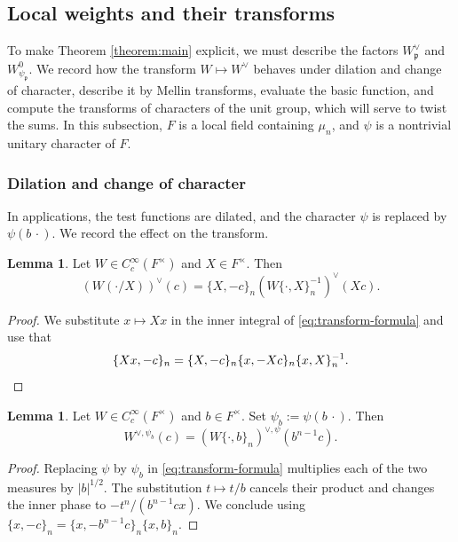 \documentclass[reqno]{amsart}
\theoremstyle{plain}
\theoremstyle{definition}
\theoremstyle{itplain}
\newtheorem{lemma}[theorem]{Lemma}
\numberwithin{equation}{section}
\numberwithin{theorem}{section}
\begin{document}
\subsection{Local weights and their transforms}\label{sec:local-computations}
To make Theorem \ref{theorem:main} explicit, we must describe the factors $W_{\mathfrak{p}}^\vee$ and $W_{\psi_{\mathfrak{p}}}^0$.  We record how the transform $W \mapsto W^\vee$ behaves under dilation and change of character, describe it by Mellin transforms, evaluate the basic function, and compute the transforms of characters of the unit group, which will serve to twist the sums.  In this subsection, $F$ is a local field containing $\mu_n$, and $\psi$ is a nontrivial unitary character of $F$.

\subsubsection{Dilation and change of character}\label{sec:dilation-and-change-of-character}
In applications, the test functions are dilated, and the character $\psi$ is replaced by $\psi(b \, \cdot)$.  We record the effect on the transform.

\begin{lemma}\label{lemma:dilation}
  Let $W \in C_c^\infty(F^\times)$ and $X \in F^\times$.  Then
  \begin{equation*}
    \left( W(\cdot / X) \right)^\vee(c) = \{X, -c\}_n \left( W \{\cdot, X\}_n^{-1} \right)^\vee(X c).
  \end{equation*}
\end{lemma}
\begin{proof}
  We substitute $x \mapsto X x$ in the inner integral of \eqref{eq:transform-formula} and use that
  \begin{equation*}
    \{X x, -c\}_n = \{X, -c\}_n \{x, - X c\}_n \{x, X\}_n^{-1}.
    \qedhere
  \end{equation*}
\end{proof}

\begin{lemma}\label{lemma:change-of-character}
  Let $W \in C_c^\infty(F^\times)$ and $b \in F^\times$.  Set $\psi_b := \psi(b \, \cdot)$.  Then
  \begin{equation*}
    W^{\vee, \psi_b}(c) = \left( W \{\cdot, b\}_n \right)^{\vee, \psi}(b^{n-1} c).
  \end{equation*}
\end{lemma}
\begin{proof}
  Replacing $\psi$ by $\psi_b$ in \eqref{eq:transform-formula} multiplies each of the two measures by $\lvert b \rvert^{1/2}$.  The substitution $t \mapsto t/b$ cancels their product and changes the inner phase to $-t^n/(b^{n-1} c x)$.  We conclude using $\{x, -c\}_n = \{x, -b^{n-1} c\}_n \{x, b\}_n$.
\end{proof}
\end{document}
